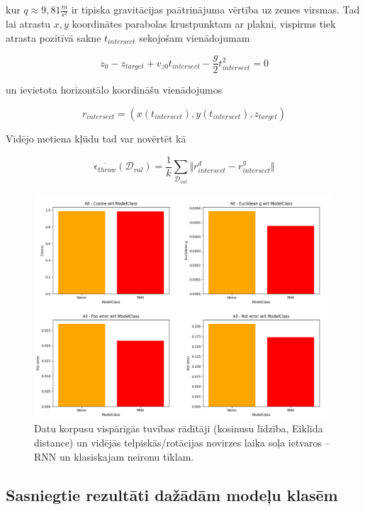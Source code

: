 \documentclass[12pt, a4paper]{article}
\numberwithin{equation}{section} %
\begin{document}
kur $q \approx 9,81 \frac{m}{s^2}$ ir tipiska gravitācijas paātrinājuma vērtība uz zemes virsmas. Tad lai atrastu $x,y$ koordinātes parabolas krustpunktam ar plakni, vispirms tiek atrasta pozitīvā sakne $t_{intersect}$ sekojošam vienādojumam

\begin{equation}
    z_0 - z_{target} + v_{z0}t_{intersect} - \frac{g}{2}t_{intersect}^2 = 0
\end{equation}

un ievietota horizontālo koordināšu vienādojumos

\begin{equation}
    r_{intersect} = \left ( x(t_{intersect}), y(t_{intersect}), z_{target} \right )
\end{equation}

Vidējo metiena kļūdu tad var novērtēt kā

\begin{equation}
    \overline{\epsilon_{throw}}(\mathcal{D}_{val}) = \frac{1}{k} \sum_{\mathcal{D}_{val}}
    \Vert r^d_{intersect} - r^g_{intersect} \Vert 
\end{equation}

\begin{figure}[t!]
    \centering
    \includegraphics[width=16cm,page=1]{../img/rnn-naive-global-stepwise.png}
    \caption{Datu korpusu vispārīgās tuvības rādītāji (kosinusu līdzība, Eiklīda distance) un vidējās telpiskās/rotācijas novirzes laika soļa ietvaros -- RNN un klasiskajam neironu tīklam.}
\end{figure}

\subsection{Sasniegtie rezultāti dažādām modeļu klasēm}
\end{document}
